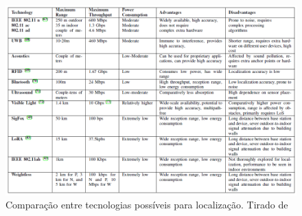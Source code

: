 \begin{figure}[H]
	\centering 
	\includegraphics[scale = 0.7]{images/technologies_table.png}
	\caption{Comparação entre tecnologias possíveis para localização. Tirado de \cite{art2}}
	\label{fig:technologies_table.png}
\end{figure}
